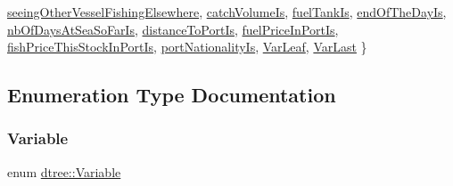 \begin{DoxyCompactItemize}
\mbox{\hyperlink{namespacedtree_a79fe30831a14df904319f9e783b3189ba3bed393ba23a7a40f5fec292291c24a3}{seeing\+Other\+Vessel\+Fishing\+Elsewhere}}, 
\mbox{\hyperlink{namespacedtree_a79fe30831a14df904319f9e783b3189ba26c13b4f7a62ff73143f62a625551c8a}{catch\+Volume\+Is}}, 
\newline
\mbox{\hyperlink{namespacedtree_a79fe30831a14df904319f9e783b3189baac2c3fb1c91c2cc7eb34b31b132f988d}{fuel\+Tank\+Is}}, 
\mbox{\hyperlink{namespacedtree_a79fe30831a14df904319f9e783b3189ba4371587cc1a1826ed967a8276b9c694a}{end\+Of\+The\+Day\+Is}}, 
\mbox{\hyperlink{namespacedtree_a79fe30831a14df904319f9e783b3189bafb2a6e46c64679dce1a692e6a9fac5ed}{nb\+Of\+Days\+At\+Sea\+So\+Far\+Is}}, 
\mbox{\hyperlink{namespacedtree_a79fe30831a14df904319f9e783b3189bab2941362fb173bc72d428063ee9f709f}{distance\+To\+Port\+Is}}, 
\newline
\mbox{\hyperlink{namespacedtree_a79fe30831a14df904319f9e783b3189bae51c70479b3438c6cb8a0df9dbf719b1}{fuel\+Price\+In\+Port\+Is}}, 
\mbox{\hyperlink{namespacedtree_a79fe30831a14df904319f9e783b3189bae2e9b442c0e37b104c7b59bbf6fb0af3}{fish\+Price\+This\+Stock\+In\+Port\+Is}}, 
\mbox{\hyperlink{namespacedtree_a79fe30831a14df904319f9e783b3189ba3cafb9f53f9cca11bd9a15bc4cddfbbc}{port\+Nationality\+Is}}, 
\mbox{\hyperlink{namespacedtree_a79fe30831a14df904319f9e783b3189bac0ae0909fc40feaac4e04b549871df71}{Var\+Leaf}}, 
\newline
\mbox{\hyperlink{namespacedtree_a79fe30831a14df904319f9e783b3189ba6d694891124f1abfdbb58c6759a88512}{Var\+Last}}
 \}
\end{DoxyCompactItemize}


\subsection{Enumeration Type Documentation}
\mbox{\label{namespacedtree_a79fe30831a14df904319f9e783b3189b}} 
\subsubsection{\texorpdfstring{Variable}{Variable}}
{\footnotesize\ttfamily enum \mbox{\hyperlink{namespacedtree_a79fe30831a14df904319f9e783b3189b}{dtree\+::\+Variable}}}

